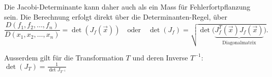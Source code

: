     Die Jacobi-Determinante kann daher auch als ein Mass für Fehlerfortpflanzung sein.
    Die Berechnung erfolgt direkt über die Determinanten-Regel, über 
    $$\frac{D(f_1, f_2, \ldots,f_n)}{D(x_1, x_2, \ldots, x_n)} = \det(J_f(\vec{x})) \quad \text{oder} \quad
    \det(J_f) = \sqrt{\det \Big( \underbrace{J_f^T(\vec{x}) J_f(\vec{x})}_{\text{Diagonalmatrix}} \Big)}.$$
    
    Ausserdem gilt für die Transformation $T$ und deren Inverse $T^{-1}$: $\det(J_T) = \frac{1}{\det{J_{T^{-1}}}}$
  \hspace{5mm}

  